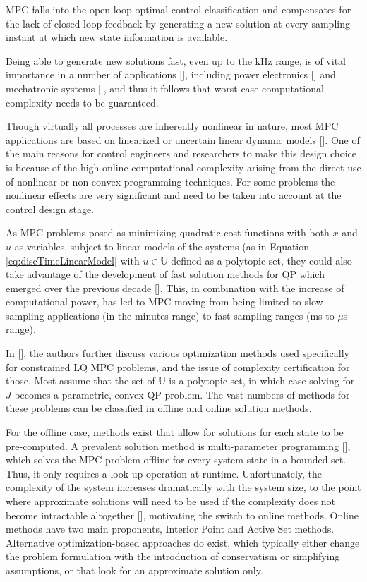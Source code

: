 \gls{MPC} falls into the open-loop optimal control classification and compensates for the lack of closed-loop feedback by generating a new solution at every sampling instant at which new state information is available. 

Being able to generate new solutions fast, even up to the kHz range, is of vital importance in a number of applications [\citeauthor{Richter2012}], including power electronics [\citeauthor{Karamanakos2016}] and mechatronic systems [\citeauthor{Broeck}], and thus it follows that worst case computational complexity needs to be guaranteed.

Though virtually all processes are inherently nonlinear in nature, most \gls{MPC} applications are based on linearized or uncertain linear dynamic models [\citeauthor{Razi2014}]. One of the main reasons for control engineers and researchers to make this design choice is because of the high online computational complexity arising from the direct use of nonlinear or non-convex programming techniques. For some problems the nonlinear effects are very significant and need to be taken into account at the control design stage. 

As \gls{MPC} problems posed as minimizing quadratic cost functions with both $x$ and $u$ as variables, subject to linear models of the systems (as in Equation \ref{eq:discTimeLinearModel} with $u \in \mathbb{U}$ defined as a polytopic set, they could also take advantage of the development of fast solution methods for \gls{QP} which emerged over the previous decade [\citeauthor{Richter2010}]. This, in combination with the increase of computational power, has led to \gls{MPC} moving from being limited to slow sampling applications (in the minutes range) to fast sampling ranges (ms to $\mu$s range).

In [\citeauthor{Richter2012}], the authors further discuss various optimization methods used specifically for constrained \gls{LQ} \gls{MPC}  problems, and the issue of complexity certification for those. Most assume that the set of $\mathbb{U}$ is a polytopic set, in which case solving for $J$ becomes a parametric, convex \gls{QP} problem. The vast numbers of methods for these problems can be classified in offline and online solution methods. 

For the offline case, methods exist that allow for solutions for each state to be pre-computed. A prevalent solution method is multi-parameter programming [\citeauthor{Richter2010}], which solves the \gls{MPC} problem offline for every system state in a bounded set. Thus, it only requires a look up operation at runtime. Unfortunately, the complexity of the system increases dramatically with the system size, to the point where approximate solutions will need to be used if the complexity does not become intractable altogether [\citeauthor{Richter2010}], motivating the switch to online methods. Online methods have two main proponents, Interior Point and Active Set methods. Alternative optimization-based approaches do exist, which typically either change the problem formulation with the introduction of conservatism or simplifying assumptions, or that look for an approximate solution only.

